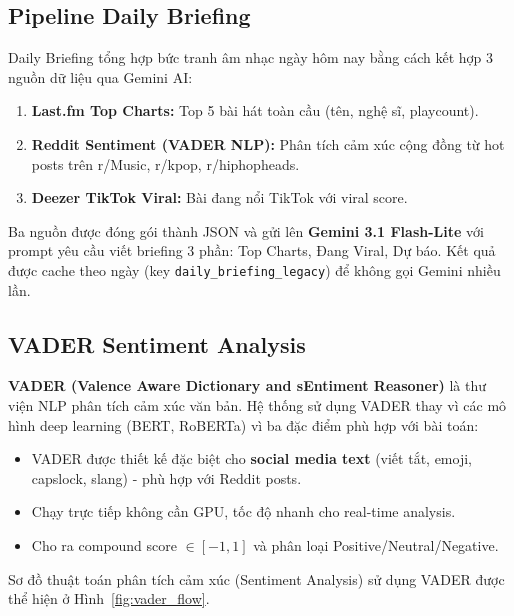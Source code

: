 \documentclass[12pt,a4paper]{report}
\begin{document}
\subsection{Pipeline Daily Briefing}

Daily Briefing tổng hợp bức tranh âm nhạc ngày hôm nay bằng cách kết hợp 3 nguồn dữ liệu qua Gemini AI:

\begin{enumerate}
    \item \textbf{Last.fm Top Charts:} Top 5 bài hát toàn cầu (tên, nghệ sĩ, playcount).
    \item \textbf{Reddit Sentiment (VADER NLP):} Phân tích cảm xúc cộng đồng từ hot posts trên r/Music, r/kpop, r/hiphopheads.
    \item \textbf{Deezer TikTok Viral:} Bài đang nổi TikTok với viral score.
\end{enumerate}

Ba nguồn được đóng gói thành JSON và gửi lên \textbf{Gemini 3.1 Flash-Lite} với prompt yêu cầu viết briefing 3 phần: Top Charts, Đang Viral, Dự báo. Kết quả được cache theo ngày (key \texttt{daily\_briefing\_legacy}) để không gọi Gemini nhiều lần.

\subsection{VADER Sentiment Analysis}

\textbf{VADER (Valence Aware Dictionary and sEntiment Reasoner)} là thư viện NLP phân tích cảm xúc văn bản. Hệ thống sử dụng VADER thay vì các mô hình deep learning (BERT, RoBERTa) vì ba đặc điểm phù hợp với bài toán:
\begin{itemize}
    \item VADER được thiết kế đặc biệt cho \textbf{social media text} (viết tắt, emoji, capslock, slang) - phù hợp với Reddit posts.
    \item Chạy trực tiếp không cần GPU, tốc độ nhanh cho real-time analysis.
    \item Cho ra compound score $\in [-1, 1]$ và phân loại Positive/Neutral/Negative.
\end{itemize}

Sơ đồ thuật toán phân tích cảm xúc (Sentiment Analysis) sử dụng VADER được thể hiện ở Hình~\ref{fig:vader_flow}.
\end{document}
